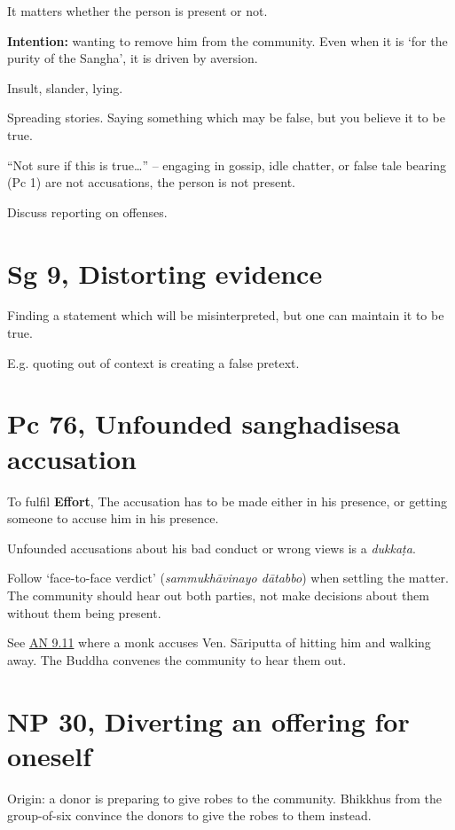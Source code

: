 It matters whether the person is present or not.

\textbf{Intention:} wanting to remove him from the community. Even when
it is `for the purity of the Sangha', it is driven by aversion.

Insult, slander, lying.

Spreading stories. Saying something which may be false, but you believe
it to be true.

``Not sure if this is true\ldots{}'' -- engaging in gossip, idle
chatter, or false tale bearing (Pc 1) are not accusations, the person is
not present.

Discuss reporting on offenses.

\section{Sg 9, Distorting evidence}

Finding a statement which will be misinterpreted, but one can maintain
it to be true.

E.g. quoting out of context is creating a false pretext.

\section{Pc 76, Unfounded sanghadisesa accusation}

To fulfil \textbf{Effort}, The accusation has to be made either in his
presence, or getting someone to accuse him in his presence.

Unfounded accusations about his bad conduct or wrong views is a
\emph{dukkaṭa}.

Follow `face-to-face verdict' (\emph{sammukhāvinayo dātabbo}) when
settling the matter. The community should hear out both parties, not
make decisions about them without them being present.

See \href{https://suttacentral.net/an9.11/en/sujato}{AN 9.11} where a
monk accuses Ven. Sāriputta of hitting him and walking away. The Buddha
convenes the community to hear them out.

\section{NP 30, Diverting an offering for oneself}

Origin: a donor is preparing to give robes to the community. Bhikkhus
from the group-of-six convince the donors to give the robes to them
instead.

